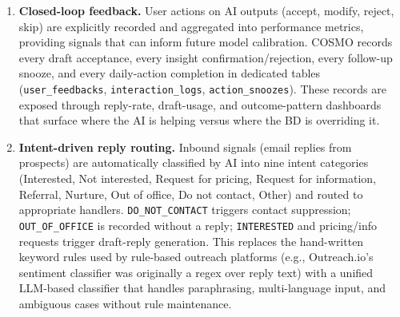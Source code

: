 \documentclass[a4paper]{article}
\begin{document}
\begin{enumerate}
  \item \textbf{Closed-loop feedback.}
    User actions on AI outputs (accept, modify, reject, skip) are
    explicitly recorded and aggregated into performance metrics,
    providing signals that can inform future model calibration.
    COSMO records every draft acceptance, every insight
    confirmation/rejection, every follow-up snooze, and every
    daily-action completion in dedicated tables (\texttt{user\_feedbacks},
\texttt{interaction\_logs}, \texttt{action\_snoozes}). These records are exposed
    through reply-rate, draft-usage, and outcome-pattern dashboards
    that surface where the AI is helping versus where the BD is
    overriding it.

  \item \textbf{Intent-driven reply routing.}
    Inbound signals (email replies from prospects) are
    automatically classified by AI into nine intent categories
    (Interested, Not interested, Request for pricing, Request for
    information, Referral, Nurture, Out of office, Do not contact, Other)
    and routed to appropriate handlers. \texttt{DO\_NOT\_CONTACT}
    triggers contact suppression; \texttt{OUT\_OF\_OFFICE} is
    recorded without a reply; \texttt{INTERESTED} and pricing/info
    requests trigger draft-reply generation. This replaces the
    hand-written keyword rules used by rule-based outreach
    platforms (e.g., Outreach.io's sentiment classifier was
    originally a regex over reply text) with a unified LLM-based
    classifier that handles paraphrasing, multi-language input,
    and ambiguous cases without rule maintenance.


\end{enumerate}
\end{document}
